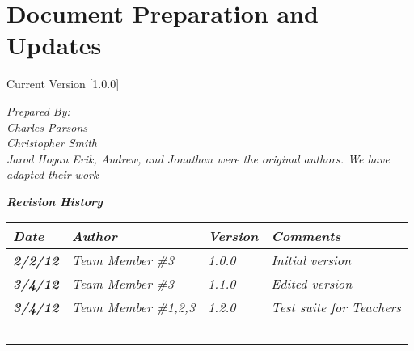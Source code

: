 
\chapter{Document Preparation and Updates}

Current Version [1.0.0]
\vspace*{5mm}

{\color{MSBlue3}
\noindent
\textit{Prepared By:}\\
\textit{Charles Parsons}\\
\textit{Christopher Smith}\\
\textit{Jarod Hogan}
\textit{Erik, Andrew, and Jonathan were the original authors. We have adapted their work}\\
}

\vfill
\noindent
{\color{color02} \textit{\textbf{Revision History}}}\\
\begin{tabular}{|>{\raggedright}p{1.5cm}|>{\raggedright}p{3cm}|>{\raggedright}p{1.5cm}|>{\raggedright}p{9cm}|}
\hline
\textit{\textbf{Date}} &  \textit{\textbf{Author}} & \textit{\textbf{Version}} & \textit{\textbf{Comments}}\tabularnewline
\hline
 \textit{\textbf{2/2/12}} & \textit{Team Member \#3} & \textit{1.0.0} & \textit{Initial version}\tabularnewline
\hline
\textit{\textbf{3/4/12}} & \textit{Team Member \#3} & \textit{1.1.0} & \textit{Edited version}\tabularnewline
\hline
\textit{\textbf{3/4/12}} & \textit{Team Member \#1,2,3} & \textit{1.2.0} & \textit{Test suite for Teachers}\tabularnewline
\hline
 &  &  & \tabularnewline
 \hline
 &  &  & \tabularnewline
\hline
 &  &  & \tabularnewline
\hline
 &  &  & \tabularnewline
\hline
 &  &  & \tabularnewline
\hline
\end{tabular}
\vfill

